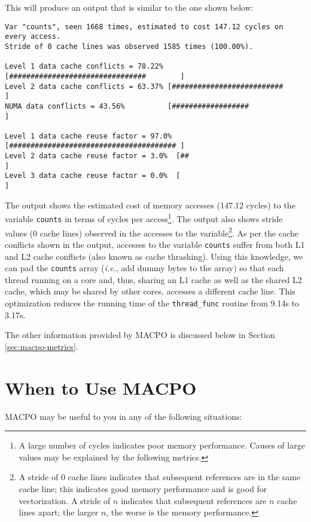 This will produce an output that is similar to the one shown below:
\begin{verbatim}
Var "counts", seen 1668 times, estimated to cost 147.12 cycles on every access.
Stride of 0 cache lines was observed 1585 times (100.00%).

Level 1 data cache conflicts = 78.22% [################################        ]
Level 2 data cache conflicts = 63.37% [##########################              ]
NUMA data conflicts = 43.56%          [##################                      ]

Level 1 data cache reuse factor = 97.0% [####################################### ]
Level 2 data cache reuse factor = 3.0%  [##                                      ]
Level 3 data cache reuse factor = 0.0%  [                                        ]
\end{verbatim}

The output shows the estimated cost of memory accesses (147.12 cycles) to the variable \texttt{counts} in terms of cycles per access\footnote{A large number of cycles indicates poor memory performance. Causes of large values may be explained by the following metrics.}. The output also shows stride values (0 cache lines) observed in the accesses to the variable\footnote{A stride of 0 cache lines indicates that subsequent references are in the same cache line; this indicates good memory performance and is good for vectorization. A stride of $n$ indicates that subsequent references are $n$ cache lines apart; the larger $n$, the worse is the memory performance.}. As per the cache conflicts shown in the output, accesses to the variable \texttt{counts} suffer from both L1 and L2 cache conflicts (also known as cache thrashing). Using this knowledge, we can pad the \texttt{counts} array (\textit{i.e.}, add dummy bytes to the array) so that each thread running on a core and, thus, sharing an L1 cache as well as the shared L2 cache, which may be shared by other cores, accesses a different cache line. This optimization reduces the running time of the \texttt{thread\_func} routine from 9.14s to 3.17s.

The other information provided by MACPO is discussed below in Section \ref{sec:macpo-metrics}.

\section{When to Use MACPO}

MACPO may be useful to you in any of the following situations:

